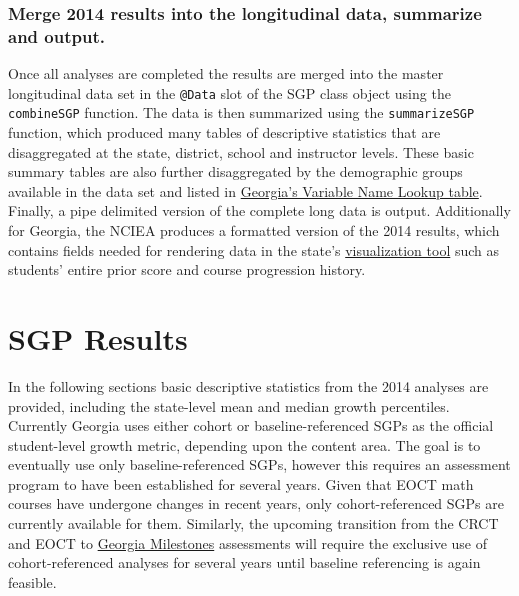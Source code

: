 \documentclass[12pt]{article}
\begin{document}
\subsubsection{Merge 2014 results into the longitudinal data, summarize
and
output.}\label{merge-2014-results-into-the-longitudinal-data-summarize-and-output.}

Once all analyses are completed the results are merged into the master
longitudinal data set in the \texttt{@Data} slot of the SGP class object
using the \texttt{combineSGP} function. The data is then summarized
using the \texttt{summarizeSGP} function, which produced many tables of
descriptive statistics that are disaggregated at the state, district,
school and instructor levels. These basic summary tables are also
further disaggregated by the demographic groups available in the data
set and listed in
\href{https://github.com/CenterForAssessment/SGPstateData/blob/master/Variable_Name_Lookup/GA_Variable_Name_Lookup.csv}{Georgia's
Variable Name Lookup table}. Finally, a pipe delimited version of the
complete long data is output. Additionally for Georgia, the NCIEA
produces a formatted version of the 2014 results, which contains fields
needed for rendering data in the state's
\href{http://gastudentgrowth.gadoe.org/}{visualization tool} such as
students' entire prior score and course progression history.

\section{SGP Results}\label{sgp-results}

In the following sections basic descriptive statistics from the 2014
analyses are provided, including the state-level mean and median growth
percentiles. Currently Georgia uses either cohort or baseline-referenced
SGPs as the official student-level growth metric, depending upon the
content area. The goal is to eventually use only baseline-referenced
SGPs, however this requires an assessment program to have been
established for several years. Given that EOCT math courses have
undergone changes in recent years, only cohort-referenced SGPs are
currently available for them. Similarly, the upcoming transition from
the CRCT and EOCT to
\href{http://www.gadoe.org/Curriculum-Instruction-and-Assessment/Assessment/Pages/Georgia-Milestones-Assessment-System.aspx}{Georgia
Milestones} assessments will require the exclusive use of
cohort-referenced analyses for several years until baseline referencing
is again feasible.
\end{document}
